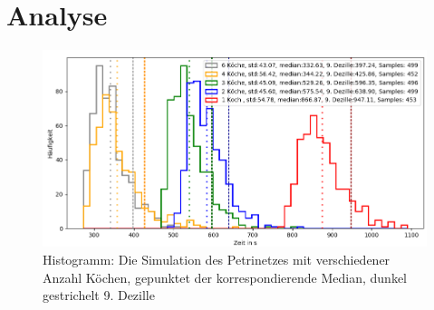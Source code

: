 \section*{Analyse} %
\label{sec:analyse}






\begin{figure}[ht]
  \includegraphics[width=1\textwidth]{pics/sim.png}
  \caption{Histogramm: Die Simulation des Petrinetzes mit verschiedener Anzahl Köchen, gepunktet der korrespondierende Median, dunkel gestrichelt 9. Dezille}
  \label{pic:sim}
\end{figure}